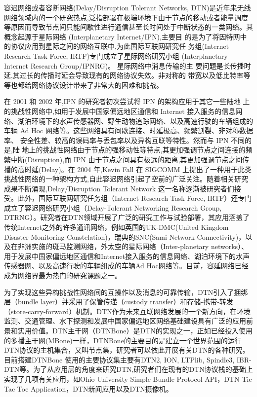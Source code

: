 \begin{introduction}

容迟网络或者容断网络(Delay/Disruption Tolerant Networks, DTN)是近年来无线网络领域内的一个研究热点,泛指部署在极端环境下由于节点的移动或者能量调度等原因而导致节点间只能间歇性进行通信甚至长时间处于中断状态的一类网络。其概念起源于星际网络 (Interplanetary Internet/IPN),主要目 的是为了将因特网中的协议应用到星际之间的网络互联中,为此国际互联网研究任 务组(Internet Research Task Force, IRTF)专门成立了星际网络研究小组 (Interplanetary Internet Research Group/IPNRG)。 星际网络中消息传输的主 要问题是长传播时延,其过长的传播时延会导致现有的网络协议失效。非对称的 带宽以及低比特率等等也都给网络协议设计带来了非常大的困难和挑战。

    在 2001 和 2002 年,IPN 的研究者初次尝试将 IPN 的架构应用于其它一些陆地 上的挑战性网络中,如用于发展中国家偏远地区通信和 Internet 接入服务的信息网 络、湖泊环境下的水声传感器网、野生动物追踪网络、以及高速行驶的车辆组成的 车辆 Ad Hoc 网络等。这些网络具有间歇连接、时延极高、频繁割裂、非对称数据率、 安全性差、较高的误码率与丢包率以及异构互联等特性。然而与 IPN 不同的是,陆 地上的挑战性网络由于节点的强移动性等特点,其更加强调节点之间连接的频繁中断(Disruption),而 IPN 由于节点之间具有极远的距离,其更加强调节点之间传播的高时延(Delay)。在 2004 年,Kevin Fall 在 SIGCOMM 上提出了一种用于此类挑战性网络的一种架构方式,自此容迟网络引起了空前的广泛关注。随着相关研究成果不断涌现,Delay/Disruption Tolerant Network 这一名称逐渐被研究者们接受。此外，国际互联网研究任务组（Internet Research Task Force, IRTF）还专门成立了容迟网络研究小组（Delay-Tolerant Networking Research Group, DTRNG）。研究者在DTN领域开展了广泛的研究工作与试验部署，其应用涵盖了传统Internet之外的许多通讯网络，例如英国的UK-DMC(United Kingdom Disaster Monitoring Constelation)，瑞典的SNC(Sami Network Connectivity)，以及在非洲实施的斑马监测网络，外太空的星际网络（Inter-planetary networks）、用于发展中国家偏远地区通信和Internet接入服务的信息网络、湖泊环境下的水声传感器网、以及高速行驶的车辆组成的车辆Ad Hoc网络等。目前，容延网络已经成为网络界最为热门的研究课题之一。

    为了实现这些异构挑战性网络间的互操作以及消息的可靠传输，DTN引入了捆绑层（bundle layer）并采用了保管传递（custody transfer）和存储-携带-转发（store-carry-forward）机制。DTN作为未来互联网络发展的一个新方向，在环境监测、交通管理、水下探测和发展中国家偏远地区网络基础建设具有广泛的应用前景和实用价值。DTN主干网（DTNBone）是DTN的实现之一，正如已经投入使用的多播主干网(MBone)一样，DTNBone的主要目的是建立一个世界范围的运行DTN协议的主机集合，又叫节点集，研究者可以依此开展有关DTN的各种研究。目前搭建DTNBone 使用的主要协议集主要有DTN2, ION, LTPlib, Spindle3, IBR-DTN等。为了从应用层的角度来研究DTN,研究者们在现有的DTN协议栈的基础上实现了几项有关应用，如Ohio University Simple Bundle Protocol API，DTN Tic Tac Toe Application，DTN新闻应用以及DTN摄像机。


\end{introduction}
